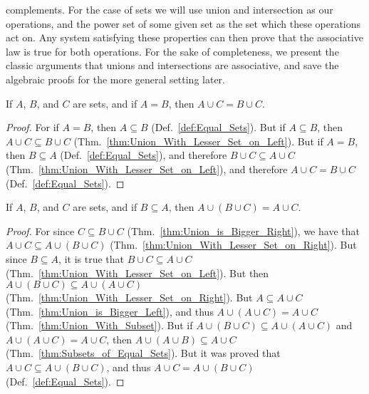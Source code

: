         complements. For the case of sets we will use union and intersection as
        our operations, and the power set of some given set as the set which
        these operations act on. Any system satisfying these properties can then
        prove that the associative law is true for both operations. For the sake
        of completeness, we present the classic arguments that unions and
        intersections are associative, and save the algebraic proofs for the
        more general setting later.
        \begin{theorem}
            \label{thm:Union_with_Equal_Sets}%
            If $A$, $B$, and $C$ are sets, and if $A=B$, then
            $A\cup{C}=B\cup{C}$.
        \end{theorem}
        \begin{proof}
            For if $A=B$, then $A\subseteq{B}$ (Def.~\ref{def:Equal_Sets}). But
            if $A\subseteq{B}$, then $A\cup{C}\subseteq{B}\cup{C}$
            (Thm.~\ref{thm:Union_With_Lesser_Set_on_Left}). But if $A=B$, then
            $B\subseteq{A}$ (Def.~\ref{def:Equal_Sets}), and therefore
            $B\cup{C}\subseteq{A}\cup{C}$
            (Thm.~\ref{thm:Union_With_Lesser_Set_on_Left}), and therefore
            $A\cup{C}=B\cup{C}$ (Def.~\ref{def:Equal_Sets}).
        \end{proof}
        \begin{theorem}
            \label{thm:Lemma_1_for_Assoc_Law_of_Unions}%
            If $A$, $B$, and $C$ are sets, and if $B\subseteq{A}$, then
            $A\cup(B\cup{C})=A\cup{C}$.
        \end{theorem}
        \begin{proof}
            For since $C\subseteq{B}\cup{C}$
            (Thm.~\ref{thm:Union_is_Bigger_Right}), we have that
            $A\cup{C}\subseteq{A}\cup(B\cup{C})$
            (Thm.~\ref{thm:Union_With_Lesser_Set_on_Right}). But since
            $B\subseteq{A}$, it is true that $B\cup{C}\subseteq{A}\cup{C}$
            (Thm.~\ref{thm:Union_With_Lesser_Set_on_Left}). But then
            $A\cup(B\cup{C})\subseteq{A}\cup(A\cup{C})$
            (Thm.~\ref{thm:Union_With_Lesser_Set_on_Right}). But
            $A\subseteq{A}\cup{C}$ (Thm.~\ref{thm:Union_is_Bigger_Left}), and
            thus $A\cup(A\cup{C})=A\cup{C}$ (Thm.~\ref{thm:Union_With_Subset}).
            But if $A\cup(B\cup{C})\subseteq{A}\cup(A\cup{C})$ and
            $A\cup(A\cup{C})=A\cup{C}$, then
            $A\cup(A\cup{B})\subseteq{A}\cup{C}$
            (Thm.~\ref{thm:Subsets_of_Equal_Sets}). But it was proved that
            $A\cup{C}\subseteq{A}\cup(B\cup{C})$, and thus
            $A\cup{C}=A\cup(B\cup{C})$ (Def.~\ref{def:Equal_Sets}).
        \end{proof}
